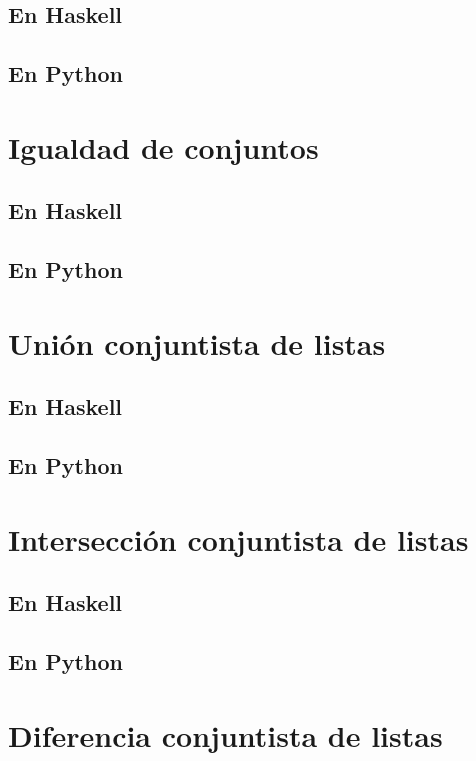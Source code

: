\documentclass[a4paper,12pt,twoside]{book}
\begin{document}
\subsection*{En Haskell}
\subsection*{En Python}

\section{Igualdad de conjuntos}
\subsection*{En Haskell}
\subsection*{En Python}

\section{Unión conjuntista de listas}
\subsection*{En Haskell}
\subsection*{En Python}

\section{Intersección conjuntista de listas}
\subsection*{En Haskell}
\subsection*{En Python}

\section{Diferencia conjuntista de listas}
\end{document}
